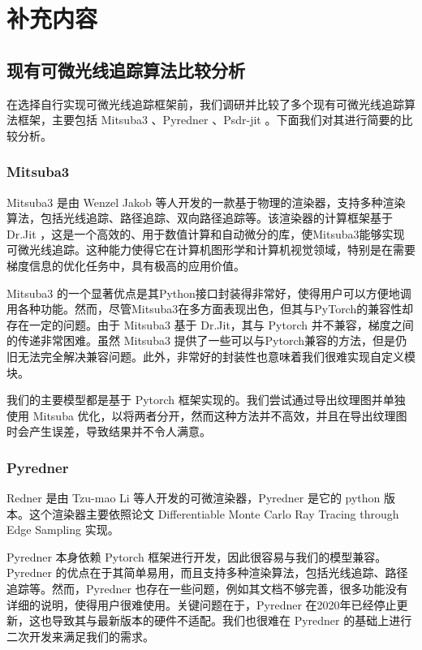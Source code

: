 
\chapter{补充内容}

\section{现有可微光线追踪算法比较分析} \label{sec:compare}

在选择自行实现可微光线追踪框架前，我们调研并比较了多个现有可微光线追踪算法框架，主要包括 Mitsuba3 \cite{Mitsuba3}、Pyredner \cite{DiffMCRT}、Psdr-jit \cite{psdrjit}。下面我们对其进行简要的比较分析。

\subsection{Mitsuba3}

Mitsuba3 是由 Wenzel Jakob 等人开发的一款基于物理的渲染器，支持多种渲染算法，包括光线追踪、路径追踪、双向路径追踪等。该渲染器的计算框架基于Dr.Jit \cite{Drjit}，这是一个高效的、用于数值计算和自动微分的库，使Mitsuba3能够实现可微光线追踪。这种能力使得它在计算机图形学和计算机视觉领域，特别是在需要梯度信息的优化任务中，具有极高的应用价值。

Mitsuba3 的一个显著优点是其Python接口封装得非常好，使得用户可以方便地调用各种功能。然而，尽管Mitsuba3在多方面表现出色，但其与PyTorch的兼容性却存在一定的问题。由于 Mitsuba3 基于 Dr.Jit，其与 Pytorch 并不兼容，梯度之间的传递非常困难。虽然 Mitsuba3 提供了一些可以与Pytorch兼容的方法，但是仍旧无法完全解决兼容问题。此外，非常好的封装性也意味着我们很难实现自定义模块。

我们的主要模型都是基于 Pytorch 框架实现的。我们尝试通过导出纹理图并单独使用 Mitsuba 优化，以将两者分开，然而这种方法并不高效，并且在导出纹理图时会产生误差，导致结果并不令人满意。

\subsection{Pyredner}

Redner 是由 Tzu-mao Li 等人开发的可微渲染器，Pyredner 是它的 python 版本。这个渲染器主要依照论文 Differentiable Monte Carlo Ray Tracing through Edge Sampling \cite{DiffMCRT} 实现。

Pyredner 本身依赖 Pytorch 框架进行开发，因此很容易与我们的模型兼容。Pyredner 的优点在于其简单易用，而且支持多种渲染算法，包括光线追踪、路径追踪等。然而，Pyredner 也存在一些问题，例如其文档不够完善，很多功能没有详细的说明，使得用户很难使用。关键问题在于，Pyredner 在2020年已经停止更新，这也导致其与最新版本的硬件不适配。我们也很难在 Pyredner 的基础上进行二次开发来满足我们的需求。

